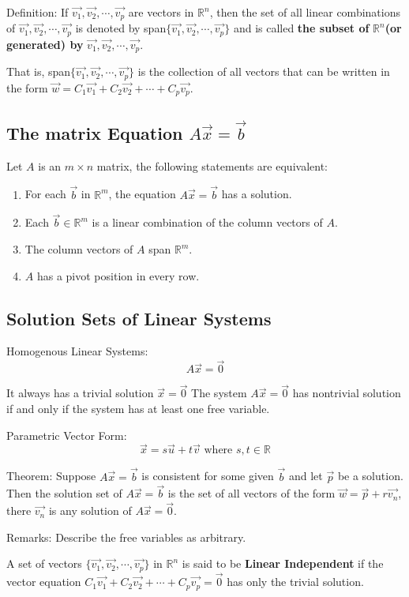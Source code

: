 \documentclass[12pt]{article}
\begin{document}
Definition: If $\vec{v_1}, \vec{v_2}, \cdots, \vec{v_p}$ are vectors in $\mathbb{R}^n$, then the set of all linear combinations of $\vec{v_1}, \vec{v_2}, \cdots, \vec{v_p}$ is denoted by span$\{\vec{v_1}, \vec{v_2}, \cdots, \vec{v_p}\}$ and is called {\bf the subset of }$\mathbb{R}^n${\bf (or generated) by }$\vec{v_1}, \vec{v_2}, \cdots, \vec{v_p}$.

That is, span$\{\vec{v_1}, \vec{v_2}, \cdots, \vec{v_p}\}$ is the collection of all vectors that can be written in the form $\vec{w} = C_1 \vec{v_1} + C_2 \vec{v_2} + \cdots + C_p \vec{v_p}$. 

\subsection{The matrix Equation $A\vec{x} = \vec{b}$}
Let $A$ is an $m \times n$ matrix, the following statements are equivalent:
\begin{enumerate}
    \item For each $\vec{b}$ in $\mathbb{R}^m$, the equation $A\vec{x} = \vec{b}$ has a solution.
    \item Each $\vec{b} \in \mathbb{R}^m$ is a linear combination of the column vectors of $A$.
    \item The column vectors of $A$ span $\mathbb{R}^m$.
    \item $A$ has a pivot position in every row.
\end{enumerate}
\subsection{Solution Sets of Linear Systems}

Homogenous Linear Systems: $$A\vec{x} = \vec{0}$$

It always has a trivial solution $\vec{x} = \vec{0}$
The system $A\vec{x} = \vec{0}$ has nontrivial solution if and only if the system has at least one free variable.

Parametric Vector Form: $$\vec{x} = s\vec{u} + t\vec{v}\text{ where } s,t \in \mathbb{R}$$

Theorem: Suppose $A\vec{x} = \vec{b}$ is consistent for some given $\vec{b}$ and let $\vec{p}$ be a solution. Then the solution set of $A\vec{x} = \vec{b}$ is the set of all vectors of the form $\vec{w} = \vec{p} + r\vec{v_n}$, there $\vec{v_n}$ is any solution of $A\vec{x} = \vec{0}$.


Remarks: Describe the free variables as arbitrary.

A set of vectors $\{\vec{v_1}, \vec{v_2}, \cdots, \vec{v_p}\}$ in $\mathbb{R}^n$ is said to be {\bf Linear Independent} if the vector equation $C_1 \vec{v_1} + C_2 \vec{v_2} + \cdots + C_p \vec{v_p} = \vec{0}$ has only the trivial solution. 
\end{document}
